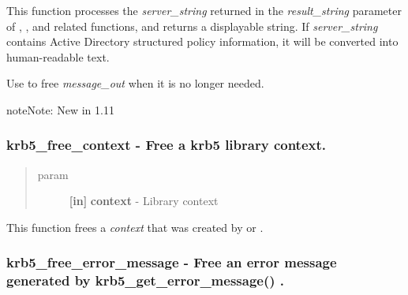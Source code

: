 \documentclass[letterpaper,10pt,english]{sphinxmanual}
\begin{document}
This function processes the \emph{server\_string} returned in the \emph{result\_string} parameter of {\hyperref[appdev/refs/api/krb5_change_password:krb5_change_password]{}} , {\hyperref[appdev/refs/api/krb5_set_password:krb5_set_password]{}} , and related functions, and returns a displayable string. If \emph{server\_string} contains Active Directory structured policy information, it will be converted into human-readable text.

Use {\hyperref[appdev/refs/api/krb5_free_string:krb5_free_string]{}} to free \emph{message\_out} when it is no longer needed.

\begin{notice}{note}{Note:}
New in 1.11
\end{notice}


\subsubsection{krb5\_free\_context -  Free a krb5 library context.}
\label{appdev/refs/api/krb5_free_context:krb5-free-context-free-a-krb5-library-context}\label{appdev/refs/api/krb5_free_context::doc}

\begin{fulllineitems}
\label{appdev/refs/api/krb5_free_context:krb5_free_context}
\end{fulllineitems}

\begin{quote}\begin{description}
\item[{param}] \leavevmode
\textbf{{[}in{]}} \textbf{context} - Library context

\end{description}\end{quote}

This function frees a \emph{context} that was created by {\hyperref[appdev/refs/api/krb5_init_context:krb5_init_context]{}} or {\hyperref[appdev/refs/api/krb5_init_secure_context:krb5_init_secure_context]{}} .


\subsubsection{krb5\_free\_error\_message -  Free an error message generated by krb5\_get\_error\_message() .}
\label{appdev/refs/api/krb5_free_error_message:krb5-free-error-message-free-an-error-message-generated-by-krb5-get-error-message}\label{appdev/refs/api/krb5_free_error_message::doc}
\end{document}
